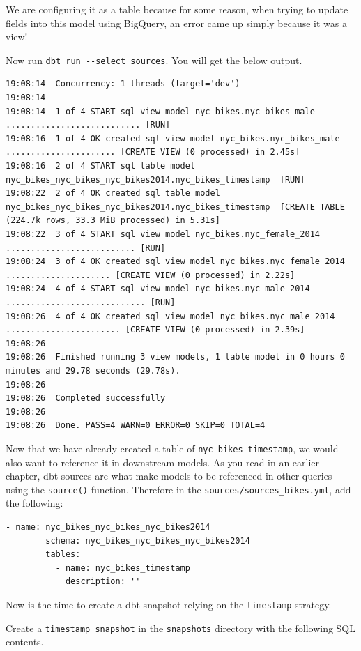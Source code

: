 \documentclass[
]{book}
\begin{document}
We are configuring it as a table because for some reason, when trying to update fields into this model using BigQuery, an error came up simply because it was a view!

Now run \texttt{dbt\ run\ -\/-select\ sources}. You will get the below output.

\begin{verbatim}
19:08:14  Concurrency: 1 threads (target='dev')
19:08:14  
19:08:14  1 of 4 START sql view model nyc_bikes.nyc_bikes_male ........................... [RUN]
19:08:16  1 of 4 OK created sql view model nyc_bikes.nyc_bikes_male ...................... [CREATE VIEW (0 processed) in 2.45s]
19:08:16  2 of 4 START sql table model nyc_bikes_nyc_bikes_nyc_bikes2014.nyc_bikes_timestamp  [RUN]
19:08:22  2 of 4 OK created sql table model nyc_bikes_nyc_bikes_nyc_bikes2014.nyc_bikes_timestamp  [CREATE TABLE (224.7k rows, 33.3 MiB processed) in 5.31s]
19:08:22  3 of 4 START sql view model nyc_bikes.nyc_female_2014 .......................... [RUN]
19:08:24  3 of 4 OK created sql view model nyc_bikes.nyc_female_2014 ..................... [CREATE VIEW (0 processed) in 2.22s]
19:08:24  4 of 4 START sql view model nyc_bikes.nyc_male_2014 ............................ [RUN]
19:08:26  4 of 4 OK created sql view model nyc_bikes.nyc_male_2014 ....................... [CREATE VIEW (0 processed) in 2.39s]
19:08:26  
19:08:26  Finished running 3 view models, 1 table model in 0 hours 0 minutes and 29.78 seconds (29.78s).
19:08:26  
19:08:26  Completed successfully
19:08:26  
19:08:26  Done. PASS=4 WARN=0 ERROR=0 SKIP=0 TOTAL=4
\end{verbatim}

Now that we have already created a table of \texttt{nyc\_bikes\_timestamp}, we would also want to reference it in downstream models. As you read in an earlier chapter, dbt sources are what make models to be referenced in other queries using the \texttt{source()} function. Therefore in the \texttt{sources/sources\_bikes.yml}, add the following:

\begin{verbatim}
- name: nyc_bikes_nyc_bikes_nyc_bikes2014
        schema: nyc_bikes_nyc_bikes_nyc_bikes2014
        tables:
          - name: nyc_bikes_timestamp
            description: ''
\end{verbatim}

Now is the time to create a dbt snapshot relying on the \texttt{timestamp} strategy.

Create a \texttt{timestamp\_snapshot} in the \texttt{snapshots} directory with the following SQL contents.
\end{document}
